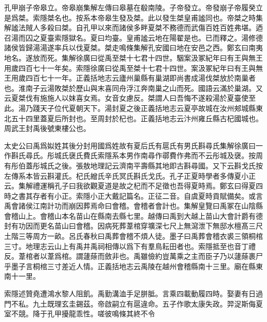 孔甲崩子帝皋立。帝皋崩集解左傳曰皋墓在殽南陵。子帝發立。帝發崩子帝履癸立是爲桀。索隱桀名也。按系本帝皋生發及桀。此以發生桀皇甫謐同也。帝桀之時集解謐法賊人多殺曰桀。自孔甲以來而諸侯多畔夏桀不務德而武傷百姓百姓弗堪。迺召湯而囚之夏臺索隱獄名。夏曰均臺。皇甫謐云地在陽翟是也。已而釋之。湯修德諸侯皆歸湯湯遂率兵以伐夏桀。桀走鳴條集解孔安國曰地在安邑之西。鄭玄曰南夷地名。遂放而死。集解徐廣曰從禹至桀十七君十四世。駰案汲冢紀年曰有王與無王用歲四百七十一年矣。索隱徐廣曰從禹至桀十七君十四世。案汲冢紀年曰有王與無王用歲四百七十一年。正義括地志云廬州巢縣有巢湖即尚書成湯伐桀放於南巢者也。淮南子云湯敗桀於歷山與末喜同舟浮江奔南巢之山而死。國語云滿於巢湖。又云夏桀伐有施施人以妺喜女焉。女音女慮反。桀謂人曰吾悔不遂殺湯於夏臺使至此。湯乃踐天子位代夏朝天下。湯封夏之後正義括地志云夏亭故城在汝州郟城縣東北五十四里蓋夏后所封也。至周封於杞也。正義括地志云汴州雍丘縣古杞國城也。周武王封禹後號東樓公也。

太史公曰禹爲姒姓其後分封用國爲姓故有夏后氏有扈氏有男氏斟尋氏集解徐廣曰一作斟氏尋氏。彤城氏襃氏費氏索隱系本男作南尋作鄩費作弗而不云彤城及襃。按周有彤伯蓋彤城氏之後。張敖地理記云濟南平壽縣其地即古斟尋國。又下云斟戈氏按左傳系本皆云斟灌氏。杞氏繒氏辛氏冥氏斟氏戈氏。孔子正夏時學者多傳夏小正云。集解禮運稱孔子曰我欲觀夏道是故之杞而不足徵也吾得夏時焉。鄭玄曰得夏四時之書其存者有小正。索隱小正大戴記篇名。正征二音。自虞夏時貢賦備矣。或言禹會諸侯江南計功而崩因葬焉命曰會稽。會稽者會計也。集解皇覽曰禹冢在山陰縣會稽山上。會稽山本名苗山在縣南去縣七里。越傳曰禹到大越上苗山大會計爵有德封有功因而更名苗山曰會稽。因病死葬葦棺穿壙深七尺上無瀉泄下無邸水檀髙三尺土階三等周方一畝。呂氏春秋曰禹葬會稽不煩人徒。墨子曰禹葬會稽衣裘三領桐棺三寸。地理志云山上有禹井禹祠相傳以爲下有羣鳥耘田者也。索隱抵至也音丁禮反。葦棺者以葦爲棺。謂蘧蒢而斂非也。禹雖儉約豈萬乘之主而臣子乃以蘧蒢裹尸乎墨子言桐棺三寸差近人情。正義括地志云禹陵在越州會稽縣南十三里。廟在縣東南十一里。

索隱述贊堯遭鴻水黎人阻飢。禹勤溝洫手足胼胝。言乘四載動履四時。娶妻有日過門不私。九土既理玄圭錫茲。帝啟嗣立有扈違命。五子作歌太康失政。羿浞斯侮夏室不競。降于孔甲擾龍乖性。嗟彼鳴條其終不令
